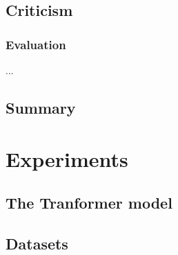 \documentclass[11pt]{article}
\begin{document}
    \subsection{Criticism}
        \subsubsection{Evaluation}
        ...

    \subsection{Summary}
    

\section{Experiments}
\label{sec:experiments}

\subsection{The Tranformer model}
\label{sec:transformer}

\subsection{Datasets}





\end{document}
